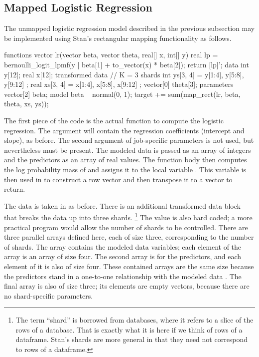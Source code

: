 \subsection{Mapped Logistic Regression}

The unmapped logistic regression model described in the previous
subsection may be implemented using Stan's rectangular mapping
functionality as follows.
%
\begin{stancode}
functions {
  vector lr(vector beta, vector theta, real[] x, int[] y) {
    real lp = bernoulli_logit_lpmf(y | beta[1] + to_vector(x) * beta[2]);
    return [lp]';
  }
}
data {
  int y[12];
  real x[12];
}
transformed data {
  // K = 3 shards
  int ys[3, 4] = { y[1:4], y[5:8], y[9:12] };
  real xs[3, 4] = { x[1:4], x[5:8], x[9:12] };
  vector[0] theta[3];
}
parameters {
  vector[2] beta;
}
model {
  beta ~ normal(0, 1);
  target += sum(map_rect(lr, beta, theta, xs, ys));
}
\end{stancode}
%
The first piece of the code is the actual function to compute the
logistic regression.  The argument  will contain the
regression coefficients (intercept and slope), as before.  The second
argument  of job-specific parameters is not used, but
nevertheless must be present.  The modeled data  is passed as
an array of integers and the predictors  as an array of real
values.  The function body then computes the log probability mass of  and
assigns it to the local variable .  This variable is then
used in  to construct a row vector and then transpose it
to a vector to return.

The data is taken in as before.  There is an additional transformed
data block that breaks the data up into three shards.%
%
\footnote{The term ``shard'' is borrowed from databases, where it
  refers to a slice of the rows of a database.  That is exactly what
  it is here if we think of rows of a dataframe.  Stan's shards are
  more general in that they need not correspond to rows of a
  dataframe.}
%
The value  is also hard coded; a more practical program would
allow the number of shards to be controlled.  There are three parallel
arrays defined here, each of size three, corresponding to the number
of shards.  The array  contains the modeled data variables;
each element of the array  is an array of size four.  The
second array  is for the predictors, and each element of it
is also of size four.  These contained arrays are the same size
because the predictors  stand in a one-to-one relationship
with the modeled data . The final array  is also
of size three;  its elements are empty vectors, because there are no
shard-specific parameters.

